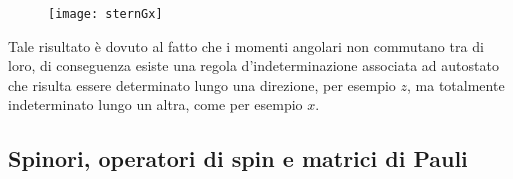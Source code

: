 \begin{figure}[!ht]
\vspace{0.2in}
\texttt{[image: sternGx]}	
\centering
\vspace{0.1in}
\end{figure}
Tale risultato \`e dovuto al fatto che i momenti angolari non commutano tra di loro, di conseguenza esiste una regola d'indeterminazione associata ad autostato che risulta essere determinato lungo una direzione, per esempio $z$, ma totalmente indeterminato lungo un altra, come per esempio $x$.

\newpage 

\subsection{Spinori, operatori di spin e matrici di Pauli}

